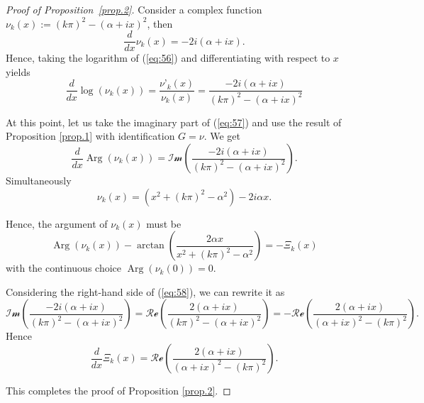 \documentclass[preprint,12pt,nopreprintline]{elsarticle}
\begin{document}
\begin{proof}[Proof of Proposition~\ref{prop.2}]\normalfont
Consider a complex function $\nu_k\left(x\right):=\left(k\pi\right)^2-\left(\alpha+ix\right)^2$,
then
\begin{equation}\label{eq:56}
\frac{d}{dx}\nu_k\left(x\right)=-2i\left(\alpha+ix\right).
\end{equation}
Hence, taking the logarithm of (\ref{eq:56}) and differentiating with respect to $x$ yields
\begin{equation}\label{eq:57}
\frac{d}{dx}\operatorname{log}\left(\nu_k\left(x\right)\right)=\frac{\nu’_k\left(x\right)}{\nu_k\left(x\right)}=\frac{-2i\left(\alpha+ix\right)}{\left(k\pi\right)^2-\left(\alpha+ix\right)^2}
\end{equation}

At this point, let us take the imaginary part of (\ref{eq:57}) and use the result of Proposition \ref{prop.1} with identification $G=\nu$. We get
\begin{equation}\label{eq:58}
\frac{d}{dx}\operatorname{Arg}\left(\nu_k\left(x\right)\right)=\mathscr{Im}\left(\frac{-2i\left(\alpha+ix\right)}{\left(k\pi\right)^2-\left(\alpha+ix\right)^2}\right).
\end{equation}
Simultaneously
\begin{equation}\label{eq:59}
\nu_k\left(x\right)=\left(x^2+\left(k\pi\right)^2-\alpha^2\right)-2i\alpha x.
\end{equation}

Hence, the argument of $\nu_k\left(x\right)$ must be
\begin{equation}\label{eq:60}
\operatorname{Arg}\left(\nu_k\left(x\right)\right)-\operatorname{arctan}\left(\frac{2\alpha x}{x^2+\left(k\pi\right)^2-\alpha^2}\right)=-\Xi_k\left(x\right)
\end{equation}
with the continuous choice $\operatorname{Arg}\left(\nu_k\left(0\right)\right)=0$.

Considering the right-hand side of (\ref{eq:58}), we can rewrite it as
\begin{equation}\label{eq:61}
\mathscr{Im}\left(\frac{-2i\left(\alpha+ix\right)}{\left(k\pi\right)^2-\left(\alpha+ix\right)^2}\right)=\mathscr{Re}\left(\frac{2\left(\alpha+ix\right)}{\left(k\pi\right)^2-\left(\alpha+ix\right)^2}\right)=-\mathscr{Re}\left(\frac{2\left(\alpha+ix\right)}{\left(\alpha+ix\right)^2-\left(k\pi\right)^2}\right).
\end{equation}
Hence
\begin{equation}\label{eq:62}
\frac{d}{dx}\Xi_k\left(x\right)=\mathscr{Re}\left(\frac{2\left(\alpha+ix\right)}{\left(\alpha+ix\right)^2-\left(k\pi\right)^2}\right).
\end{equation}

This completes the proof of Proposition \ref{prop.2}.
\end{proof}
\end{document}
